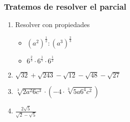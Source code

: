 \documentclass[a4paper]{article}
\begin{document}
\subsubsection{Tratemos de resolver el parcial}
\begin{enumerate}
    \item Resolver con propiedades
    \begin{itemize}
        \item $(a^2)^{\frac{1}{2}}:(a^3)^{\frac{2}{3}}$
        \item $6^{\frac{2}{3}}\cdot 6^{\frac{1}{5}} \cdot 6^{\frac{1}{2}}$
    \end{itemize}
    \item $\sqrt{32}+\sqrt{243}-\sqrt{12}-\sqrt{48}-\sqrt{27}$
    \item $\sqrt[3]{2a^2 6c^3} \cdot (-4\cdot \sqrt[3]{5a6^4c^2})$
    \item $\frac{2\sqrt{5}}{\sqrt{2}-\sqrt{5}}$
\end{enumerate}
\end{document}
